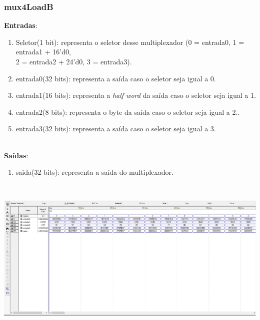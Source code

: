 \documentclass{article}
\begin{document}
    \subsubsection{mux4LoadB}
    \textbf{Entradas}:
    \begin{enumerate}
        \item Seletor(1 bit): representa o seletor desse multiplexador (0 = entrada0, 1 = entrada1 + 16'd0, \\2 = entrada2 + 24'd0, 3 = entrada3).
        \item entrada0(32 bits): representa a saída caso o seletor seja igual a 0.
        \item entrada1(16 bits): representa a {\it half word} da saída caso o seletor seja igual a 1.
        \item entrada2(8 bits): representa o byte da saída caso o seletor seja igual a 2..
        \item entrada3(32 bits): representa a saída caso o seletor seja igual a 3.\\
    \end{enumerate}
    \\
    \textbf{Saídas}:
    \begin{enumerate}
        \item saida(32 bits): representa a saída do multiplexador.\\
    \end{enumerate}\\
    \begin{center}
        \includegraphics[scale=0.4]{mux4LoadB.PNG}
    \end{center}
    
    \newpage
\end{document}
